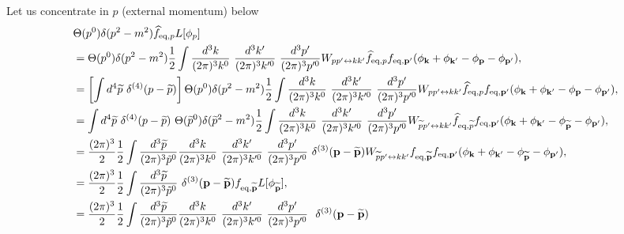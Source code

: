 \documentclass[aps,prd,preprint,nofootinbib,amsmath,amssymb,showpacs,longbibliography,singlecolumn,superscriptaddress,10pt]{revtex4-1}
\theoremstyle{plain}
\theoremstyle{definition}
\begin{document}
Let us concentrate in $p$ (external momentum) below
%
\begin{equation}
\label{Lhat}
\begin{aligned}
&
\Theta(p^{0})\delta(p^{2}-m^{2})\widehat{f}_{\mathrm{eq},p}
L[\phi_{p}]
\\
&
=
\Theta(p^{0})\delta(p^{2}-m^{2})
\frac{1}{2}\int \frac{d^{3}k}{(2 \pi)^{3} k^{0}} \ \frac{d^{3}k'}{(2 \pi)^{3} k'^{0}} \ \frac{d^{3}p'}{(2 \pi)^{3} p'^{0}}  W_{pp' \leftrightarrow kk'} \widehat{f}_{\mathrm{eq},p} f_{\mathrm{eq},\textbf{p}'} (  \phi_{\textbf{k}} + \phi_{\textbf{k}'} - \phi_{\textbf{p}} - \phi_{\textbf{p}'}  ),
\\
&
=
\left[\int d^{4}\widetilde{p} \ \delta^{(4)}(p - \widetilde{p}) \right] \Theta(p^{0})\delta(p^{2}-m^{2}) 
\frac{1}{2}\int \frac{d^{3}k}{(2 \pi)^{3} k^{0}} \ \frac{d^{3}k'}{(2 \pi)^{3} k'^{0}} \ \frac{d^{3}p'}{(2 \pi)^{3} p'^{0}}  W_{pp' \leftrightarrow kk'} \widehat{f}_{\mathrm{eq},p} f_{\mathrm{eq},\textbf{p}'} (  \phi_{\textbf{k}} + \phi_{\textbf{k}'} - \phi_{\textbf{p}} - \phi_{\textbf{p}'}  ),
\\
&
=
\int d^{4}\widetilde{p} \ \delta^{(4)}(p - \widetilde{p}) \ \Theta(\widetilde{p}^{0})\delta(\widetilde{p}^{2}-m^{2}) 
\frac{1}{2}\int \frac{d^{3}k}{(2 \pi)^{3} k^{0}} \ \frac{d^{3}k'}{(2 \pi)^{3} k'^{0}} \ \frac{d^{3}p'}{(2 \pi)^{3} p'^{0}}    W_{\widetilde{p}p' \leftrightarrow kk'} \widehat{f}_{\mathrm{eq},\widetilde{p}} f_{\mathrm{eq},\textbf{p}'} (  \phi_{\textbf{k}} + \phi_{\textbf{k}'} - \phi_{\widetilde{\textbf{p}}} - \phi_{\textbf{p}'}  ),
\\
&
=
\frac{(2 \pi)^{3}}{2} 
\frac{1}{2} \int \frac{d^{3}\widetilde{p}}{(2 \pi)^{3}\Tilde{p}^{0}} 
\frac{d^{3}k}{(2 \pi)^{3} k^{0}} \ \frac{d^{3}k'}{(2 \pi)^{3} k'^{0}} \ \frac{d^{3}p'}{(2 \pi)^{3} p'^{0}} \ \delta^{(3)}(\textbf{p} - \widetilde{\textbf{p}})  W_{\widetilde{p}p' \leftrightarrow kk'} f_{\mathrm{eq},\widetilde{\textbf{p}}} f_{\mathrm{eq},\textbf{p}'} (  \phi_{\textbf{k}} + \phi_{\textbf{k}'} - \phi_{\widetilde{\textbf{p}}} - \phi_{\textbf{p}'}  ),
\\
&
=
\frac{(2 \pi)^{3}}{2} 
\frac{1}{2} \int \frac{d^{3}\widetilde{p}}{(2 \pi)^{3}\Tilde{p}^{0}} 
\ \delta^{(3)}(\textbf{p} - \widetilde{\textbf{p}})  f_{\mathrm{eq},\widetilde{\textbf{p}}}
L[\phi_{\widetilde{\textbf{p}}}],
\\
&
=
\frac{(2 \pi)^{3}}{2} 
\frac{1}{2} \int \frac{d^{3}\widetilde{p}}{(2 \pi)^{3}\Tilde{p}^{0}} 
\frac{d^{3}k}{(2 \pi)^{3} k^{0}} \ \frac{d^{3}k'}{(2 \pi)^{3} k'^{0}} \ \frac{d^{3}p'}{(2 \pi)^{3} p'^{0}} \
\ \delta^{(3)}(\textbf{p} - \widetilde{\textbf{p}})  

\end{aligned}
\end{equation}
\end{document}
